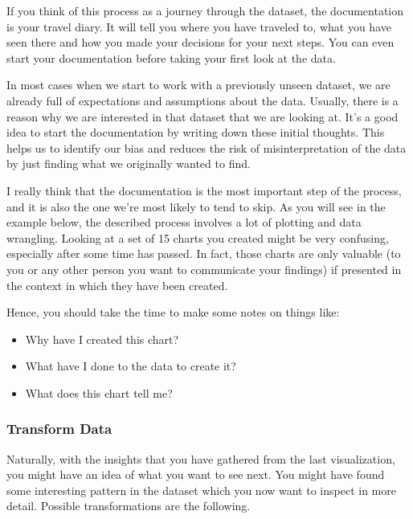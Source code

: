 \documentclass[]{book}
\providecommand{\tightlist}{%
  \setlength{\itemsep}{0pt}\setlength{\parskip}{0pt}}
\theoremstyle{definition}
\theoremstyle{definition}
\theoremstyle{definition}
\theoremstyle{remark}
\begin{document}
If you think of this process as a journey through the dataset, the
documentation is your travel diary. It will tell you where you have
traveled to, what you have seen there and how you made your decisions
for your next steps. You can even start your documentation before taking
your first look at the data.

In most cases when we start to work with a previously unseen dataset, we
are already full of expectations and assumptions about the data.
Usually, there is a reason why we are interested in that dataset that we
are looking at. It's a good idea to start the documentation by writing
down these initial thoughts. This helps us to identify our bias and
reduces the risk of misinterpretation of the data by just finding what
we originally wanted to find.

I really think that the documentation is the most important step of the
process, and it is also the one we're most likely to tend to skip. As
you will see in the example below, the described process involves a lot
of plotting and data wrangling. Looking at a set of 15 charts you
created might be very confusing, especially after some time has passed.
In fact, those charts are only valuable (to you or any other person you
want to communicate your findings) if presented in the context in which
they have been created.

Hence, you should take the time to make some notes on things like:

\begin{itemize}
\tightlist
\item
  Why have I created this chart?
\item
  What have I done to the data to create it?
\item
  What does this chart tell me?
\end{itemize}

\subsubsection{Transform Data}\label{transform-data}

Naturally, with the insights that you have gathered from the last
visualization, you might have an idea of what you want to see next. You
might have found some interesting pattern in the dataset which you now
want to inspect in more detail. Possible transformations are the
following.
\end{document}
